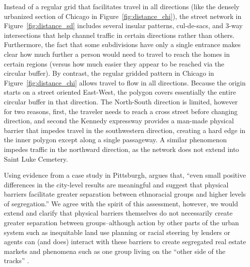 \documentclass[
  10pt,
]{article}
\begin{document}
Instead of a regular grid that facilitates travel in all directions
(like the densely urbanized section of Chicago in
Figure~\ref{fig:distance_chi}), the street network in
Figure~\ref{fig:distance_sd} includes several insular patterns,
cul-de-sacs, and 3-way intersections that help channel traffic in
certain directions rather than others. Furthermore, the fact that some
subdivisions have only a single entrance makes clear how much further a
person would need to travel to reach the homes in certain regions
(versus how much easier they appear to be reached via the circular
buffer). By contrast, the regular gridded pattern in Chicago in
Figure~\ref{fig:distance_chi} allows travel to flow in all directions.
Because the origin starts on a street oriented East-West, the polygon
covers essentially the entire circular buffer in that direction. The
North-South direction is limited, however for two reasons, first, the
traveler needs to reach a cross street before changing direction, and
second the Kennedy expressway provides a man-made physical barrier that
impedes travel in the southwestern direction, creating a hard edge in
the inner polygon except along a single passageway. A similar phenomenon
impedes traffic in the northward direction, as the network does not
extend into Saint Luke Cemetery.

Using evidence from a case study in Pittsburgh,
\citet[p.~28]{roberto2018SpatialProximity} argues that, ``even small
positive differences in the city-level results are meaningful and
suggest that physical barriers facilitate greater separation between
ethnoracial groups and higher levels of segregation.'' We agree with the
spirit of this assessment, however, we would extend and clarify that
physical barriers themselves do not necessarily create greater
separation between groups--although action by other parts of the urban
system such as inequitable land use planning or racial steering by
lenders or agents can (and does) interact with these barriers to create
segregated real estate markets and phenomena such as one group living on
the ``other side of the tracks'' \citep{roberto2018SpatialProximity}.
\end{document}
